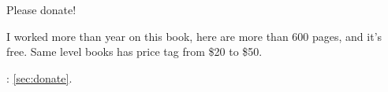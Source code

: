 \begin{center}
\vspace*{\fill}

\Huge{}
{Please donate}!
\normalsize

\bigskip
\bigskip
\bigskip

\Large{}
{I worked more than year on this book, here are more than 600 pages, and it's free.
Same level books has price tag from \$20 to \$50.}
\normalsize

\bigskip
\bigskip
\bigskip

: \ref{sec:donate}.

\vspace*{\fill}
\vfill
\end{center}
